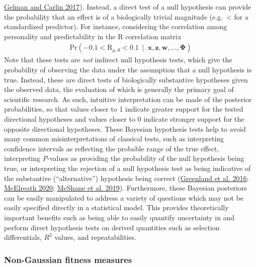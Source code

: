 \documentclass{article}
\begin{document}
\protect\hyperlink{ref-Gelman2017}{Gelman and Carlin 2017}). Instead, a
direct test of a null hypothesis can provide the probability that an
effect is of a biologically trivial magnitude (e.g.~\textless{}
\textbar{} for a standardized predictor). For instance,
considering the correlation among personality and predictability in the
\(\boldsymbol{\mathrm{R}}\) correlation matrix \begin{align*}
\mathrm{Pr}\left( -0.1 < \boldsymbol{\mathrm{R}}_{\mu, \theta}  < 0.1  \ \mid \ \boldsymbol{x},\boldsymbol{z},\boldsymbol{w},...,\boldsymbol{\Phi} \right)
\end{align*} Note that these tests are \emph{not} indirect null
hypothesis tests, which give the probability of observing the data under
the assumption that a null hypothesis is true. Instead, these are direct
tests of biologically substantive hypotheses given the observed data,
the evaluation of which is generally the primary goal of scientific
research. As such, intuitive interpretation can be made of the posterior
probabilities, so that values closer to 1 indicate greater support for
the tested directional hypotheses and values closer to 0 indicate
stronger support for the opposite directional hypotheses. These Bayesian
hypothesis tests help to avoid many common misinterpretations of
classical tests, such as interpreting confidence intervals as reflecting
the probable range of the true effect, interpreting \emph{P}-values as
providing the probability of the null hypothesis being true, or
interpreting the rejection of a null hypothesis test as being indicative
of the substantive (``alternative'') hypothesis being correct
(\protect\hyperlink{ref-Green2016}{Greenland et al. 2016};
\protect\hyperlink{ref-Rethinking}{McElreath 2020};
\protect\hyperlink{ref-McShane2019}{McShane et al. 2019}). Furthermore,
these Bayesian posteriors can be easily manipulated to address a variety
of questions which may not be easily specified directly in a statistical
model. This provides theoretically important benefits such as being able
to easily quantify uncertainty in and perform direct hypothesis tests on
derived quantities such as selection differentials, \(R^2\) values, and
repeatabilities.

\hypertarget{non-gaussian-fitness-measures}{%
\subsubsection{Non-Gaussian fitness
measures}\label{non-gaussian-fitness-measures}}
\end{document}
